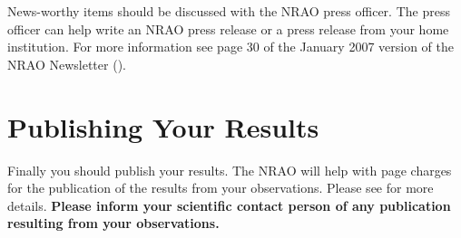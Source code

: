 News-worthy items should be discussed with the \gls{NRAO} press officer.
The press officer can help write an \gls{NRAO} press release or a press
release from your home institution.  For more information see
page 30 of the January 2007 version of the \gls{NRAO} Newsletter
\hfil\break
().

\section{Publishing Your Results}

Finally you should publish your results.  The \gls{NRAO} will help with page
charges for the publication of the results from your observations.  Please
see  for more details.
{\bf Please inform your scientific contact person of any publication resulting
from your observations.}
